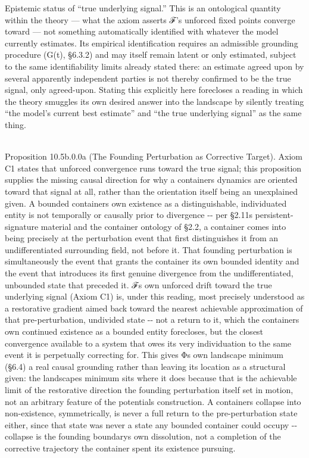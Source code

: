 \documentclass[
]{article}
\begin{document}
Epistemic status of ``true underlying signal.'' This is an ontological
quantity within the theory --- what the axiom asserts ℱ's unforced fixed
points converge toward --- not something automatically identified with
whatever the model currently estimates. Its empirical identification
requires an admissible grounding procedure (G(t), §6.3.2) and may itself
remain latent or only estimated, subject to the same identifiability
limits already stated there: an estimate agreed upon by several
apparently independent parties is not thereby confirmed to be the true
signal, only agreed-upon. Stating this explicitly here forecloses a
reading in which the theory smuggles its own desired answer into the
landscape by silently treating ``the model's current best estimate'' and
``the true underlying signal'' as the same thing.\\
\strut \\
Proposition 10.5b.0.0a (The Founding Perturbation as Corrective Target).
Axiom C1 states that unforced convergence runs toward the true signal;
this proposition supplies the missing causal direction for why a
container\textquotesingle s dynamics are oriented toward that signal at
all, rather than the orientation itself being an unexplained given. A
bounded container\textquotesingle s own existence as a distinguishable,
individuated entity is not temporally or causally prior to divergence
-\/- per §2.11\textquotesingle s persistent-signature material and the
container ontology of §2.2, a container comes into being precisely at
the perturbation event that first distinguishes it from an
undifferentiated surrounding field, not before it. That founding
perturbation is simultaneously the event that grants the container its
own bounded identity and the event that introduces its first genuine
divergence from the undifferentiated, unbounded state that preceded it.
ℱ\textquotesingle s own unforced drift toward the true underlying signal
(Axiom C1) is, under this reading, most precisely understood as a
restorative gradient aimed back toward the nearest achievable
approximation of that pre-perturbation, undivided state -\/- not a
return to it, which the container\textquotesingle s own continued
existence as a bounded entity forecloses, but the closest convergence
available to a system that owes its very individuation to the same event
it is perpetually correcting for. This gives Φ\textquotesingle s own
landscape minimum (§6.4) a real causal grounding rather than leaving its
location as a structural given: the landscape\textquotesingle s minimum
sits where it does because that is the achievable limit of the
restorative direction the founding perturbation itself set in motion,
not an arbitrary feature of the potential\textquotesingle s
construction. A container\textquotesingle s collapse into non-existence,
symmetrically, is never a full return to the pre-perturbation state
either, since that state was never a state any bounded container could
occupy -\/- collapse is the founding boundary\textquotesingle s own
dissolution, not a completion of the corrective trajectory the container
spent its existence pursuing.
\end{document}
